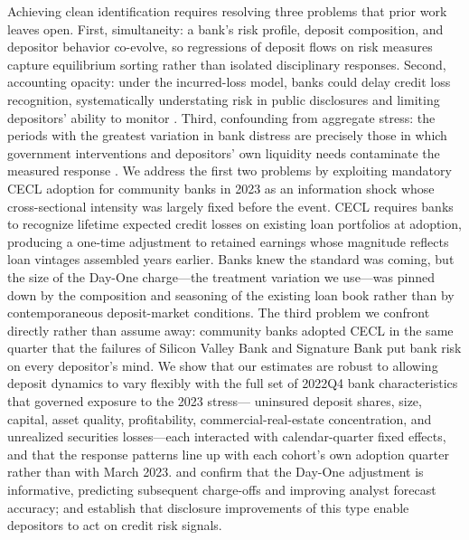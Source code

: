 Achieving clean identification requires resolving three problems that prior work
leaves open.  First, simultaneity: a bank's risk profile, deposit composition,
and depositor behavior co-evolve, so regressions of deposit flows on risk
measures capture equilibrium sorting rather than isolated disciplinary responses.
Second, accounting opacity: under the incurred-loss model, banks could delay
credit loss recognition, systematically understating risk in public disclosures
and limiting depositors' ability to monitor \citep{bushman2012accounting,
bushman2015delayed}.  Third, confounding from aggregate stress: the periods with
the greatest variation in bank distress are precisely those in which government
interventions and depositors' own liquidity needs contaminate the measured
response \citep{bennett2015market}.  We address the first two problems by
exploiting mandatory CECL adoption for community banks in 2023 as an information
shock whose cross-sectional intensity was largely fixed before the event.  CECL
requires banks to recognize lifetime expected credit losses on existing loan
portfolios at adoption, producing a one-time adjustment to retained earnings
whose magnitude reflects loan vintages assembled years earlier.  Banks knew the
standard was coming, but the size of the Day-One charge---the treatment
variation we use---was pinned down by the composition and seasoning of the
existing loan book rather than by contemporaneous deposit-market conditions.
The third problem we confront directly rather than assume away: community banks
adopted CECL in the same quarter that the failures of Silicon Valley Bank and
Signature Bank put bank risk on every depositor's mind.  We show that our
estimates are robust to allowing deposit dynamics to vary flexibly with the full
set of 2022Q4 bank characteristics that governed exposure to the 2023 stress---%
uninsured deposit shares, size, capital, asset quality, profitability,
commercial-real-estate concentration, and unrealized securities losses---each
interacted with calendar-quarter fixed effects, and that the response patterns
line up with each cohort's own adoption quarter rather than with March 2023.
\citet{kim2026current} and \citet{gee2022decision}
confirm that the Day-One adjustment is informative, predicting subsequent
charge-offs and improving analyst forecast accuracy; \citet{nier2006market} and
\citet{chen2022bank} establish that disclosure improvements of this type enable
depositors to act on credit risk signals.

